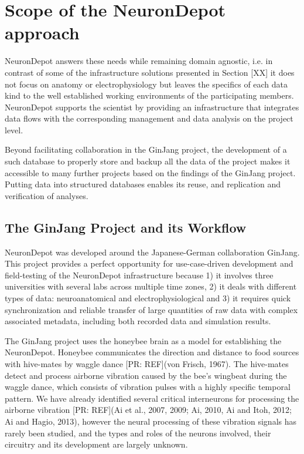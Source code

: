 \documentclass{frontiersSCNS} %
\newcommand{\pr}[1]{[\textcolor{YellowOrange}{PR: #1}]}
\begin{document}

\section{Scope of the NeuronDepot approach}

NeuronDepot answers these needs while remaining domain agnostic, i.e. in
contrast of some of the infrastructure solutions presented in Section [XX] it
does not focus on anatomy or electrophysiology but leaves the specifics of each
data kind to the well established working environments of the participating
members. NeuronDepot supports the scientist by providing an infrastructure that
integrates data flows with the corresponding management and data analysis on
the project level.

Beyond facilitating collaboration in the GinJang project,  the development of a
such database to properly store and backup all the data of the project makes it
accessible to many further projects based on the findings of the GinJang
project. Putting data into structured databases enables its reuse, and
replication and verification of analyses.

\subsection{The GinJang Project and its Workflow}

NeuronDepot was developed around the Japanese-German collaboration GinJang.
This project provides a perfect opportunity for use-case-driven development and
field-testing of the NeuronDepot infrastructure because 1) it involves three
universities with several labs across multiple time zones, 2) it deals with
different types of data: neuroanatomical and electrophysiological and 3) it
requires quick synchronization and reliable transfer of large quantities of raw
data with complex associated metadata, including both recorded data and
simulation results.

The GinJang project uses the honeybee brain as a model for establishing the
NeuronDepot. Honeybee communicates the direction and distance to food sources
with hive-mates by waggle dance \pr{REF}(von Frisch, 1967). The hive-mates detect and
process airborne vibration caused by the bee's wingbeat during the waggle
dance, which consists of vibration pulses with a highly specific temporal
pattern. We have already identified several critical interneurons for
processing the airborne vibration \pr{REF}(Ai et al., 2007, 2009; Ai, 2010, Ai and
Itoh, 2012; Ai and Hagio, 2013), however the neural processing of these
vibration signals has rarely been studied, and the types and roles of the
neurons involved, their circuitry and its development are largely unknown. 
\end{document}
